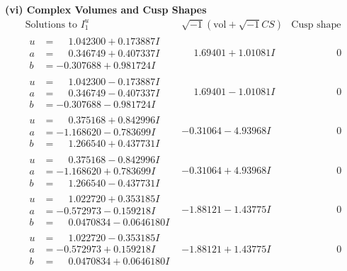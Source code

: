 \documentclass[1p]{elsarticle_modified}
\theoremstyle{definition}
\newcommand{\I}{\sqrt{-1}}
\begin{document}
\newpage\flushleft \textbf{(vi) Complex Volumes and Cusp Shapes}
$$\begin{array}{c|c|c}  
\text{Solutions to }I^u_{1}& \I (\text{vol} + \sqrt{-1}CS) & \text{Cusp shape}\\
 \hline 
\begin{aligned}
u &= \phantom{-}1.042300 + 0.173887 I \\
a &= \phantom{-}0.346749 + 0.407337 I \\
b &= -0.307688 + 0.981724 I\end{aligned}
 & \phantom{-}1.69401 + 1.01081 I & \phantom{-0.000000 } 0 \\ \hline\begin{aligned}
u &= \phantom{-}1.042300 - 0.173887 I \\
a &= \phantom{-}0.346749 - 0.407337 I \\
b &= -0.307688 - 0.981724 I\end{aligned}
 & \phantom{-}1.69401 - 1.01081 I & \phantom{-0.000000 } 0 \\ \hline\begin{aligned}
u &= \phantom{-}0.375168 + 0.842996 I \\
a &= -1.168620 - 0.783699 I \\
b &= \phantom{-}1.266540 + 0.437731 I\end{aligned}
 & -0.31064 - 4.93968 I & \phantom{-0.000000 } 0 \\ \hline\begin{aligned}
u &= \phantom{-}0.375168 - 0.842996 I \\
a &= -1.168620 + 0.783699 I \\
b &= \phantom{-}1.266540 - 0.437731 I\end{aligned}
 & -0.31064 + 4.93968 I & \phantom{-0.000000 } 0 \\ \hline\begin{aligned}
u &= \phantom{-}1.022720 + 0.353185 I \\
a &= -0.572973 - 0.159218 I \\
b &= \phantom{-}0.0470834 - 0.0646180 I\end{aligned}
 & -1.88121 - 1.43775 I & \phantom{-0.000000 } 0 \\ \hline\begin{aligned}
u &= \phantom{-}1.022720 - 0.353185 I \\
a &= -0.572973 + 0.159218 I \\
b &= \phantom{-}0.0470834 + 0.0646180 I\end{aligned}
 & -1.88121 + 1.43775 I & \phantom{-0.000000 } 0 \\ \hline\begin{aligned}

\end{aligned}
\end{array}$$
\end{document}
